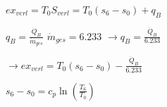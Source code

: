 \( ex_{verl} = T_0 S_{verl} = T_0 (s_6 - s_0) + q_B \)  

\( q_B = \frac{\dot{Q}_B}{\dot{m}_{ges}} \)  
\( \dot{m}_{ges} = 6.233 \)  
\( \rightarrow q_B = \frac{\dot{Q}_B}{6.233} \)  

\( \rightarrow ex_{verl} = T_0 (s_6 - s_0) - \frac{\dot{Q}_B}{6.233} \)  

\( s_6 - s_0 = c_p \ln \left(\frac{T_6}{T_0}\right) \)